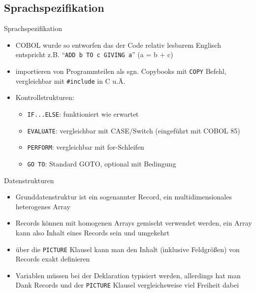 \documentclass[handout]{beamer}
\begin{document}
\subsection{Sprachspezifikation}
\begin{frame}{Sprachspezifikation}
	\begin{itemize}[<+->]
		\item
			COBOL wurde so entworfen das der Code relativ lesbarem Englisch entspricht z.B. ``\texttt{ADD b TO c GIVING a}'' (a = b + c)
		\item
			importieren von Programmteilen als sgn. Copybooks mit \texttt{COPY} Befehl, vergleichbar mit \texttt{\#include} in C u.\"A.
		\item
			Kontrollstrukturen:
			\begin{itemize}[<+->]
				\item \texttt{IF...ELSE}: funktioniert wie erwartet
				\item \texttt{EVALUATE}: vergleichbar mit CASE/Switch (eingeführt mit COBOL 85)
				\item \texttt{PERFORM}: vergleichbar mit for-Schleifen
				\item \texttt{GO TO}: Standard GOTO, optional mit Bedingung
			\end{itemize}
	\end{itemize}
\end{frame}

\begin{frame}{Datenstrukturen}
	\begin{itemize}[<+->]
		\item
			Grunddatenstruktur ist ein sogenannter Record, ein multidimensionales heterogenes Array
		\item
			Records k\"onnen mit homogenen Arrays gemischt verwendet werden, ein Array kann also Inhalt eines Records sein und umgekehrt
		\item
			über die \texttt{PICTURE} Klausel kann man den Inhalt (inklusive Feldgrößen) von Records exakt definieren
		\item
			Variablen müssen bei der Deklaration typisiert werden, allerdings hat man Dank Records und der \texttt{PICTURE} Klausel vergleichsweise viel Freiheit dabei
	\end{itemize}
\end{frame}
\end{document}
